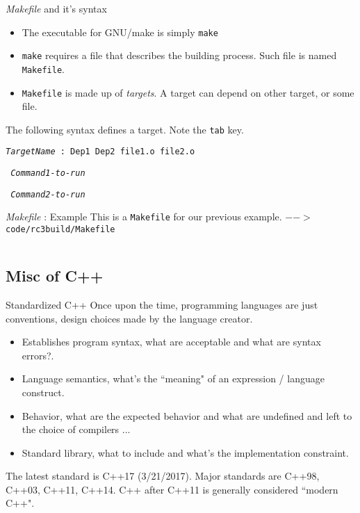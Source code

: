 \begin{frame}{\textit{Makefile} and it's syntax}
\begin{itemize}
	\item The executable for GNU/make is simply \texttt{make}
	\item \texttt{make} requires a file that describes the building process. Such file is named \texttt{Makefile}. 
	\item \texttt{Makefile} is made up of \textit{targets}. A target can depend on other target, or some file.
\end{itemize}

The following syntax defines a target. Note the \texttt{tab} key.

\vspace{0.1in}

\texttt{\textit{TargetName} : Dep1 Dep2 file1.o file2.o}

\texttt{\keys{\tab} \textit{Command1-to-run}}

\texttt{\keys{\tab} \textit{Command2-to-run}}

\end{frame}

\begin{frame}{\textit{Makefile} : Example}
This is a \texttt{Makefile} for our previous example.
\texttt{$-->$ code/rc3build/Makefile}
\inputminted{c++}{code/rc3build/Makefile}
\end{frame}

\subsection{Misc of C++}
\begin{frame}{Standardized C++}
Once upon the time, programming languages are just conventions, design choices made by the language creator. 

\begin{itemize}
	\item Establishes program syntax, what are acceptable and what are syntax errors?.
	\item Language semantics, what's the ``meaning" of an expression / language construct.
	\item Behavior, what are the expected behavior and what are undefined and left to the choice of compilers ...
	\item Standard library, what to include and what's the implementation constraint.
\end{itemize}
The latest standard is C++17 (3/21/2017). Major standards are C++98, C++03, C++11, C++14. C++ after C++11 is generally considered ``modern C++". 
\end{frame}

